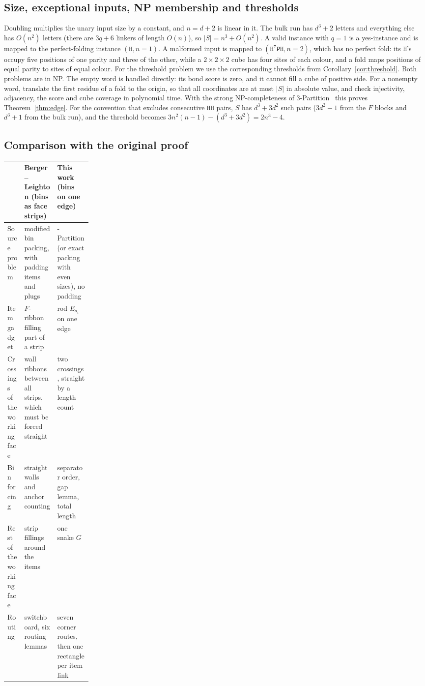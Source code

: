 \documentclass[11pt,letterpaper]{article}
\theoremstyle{definition}
\theoremstyle{remark}
\newcommand{\Hh}{\mathtt{H}}
\newcommand{\Pp}{\mathtt{P}}
\begin{document}
\subsection{Size, exceptional inputs, NP membership and thresholds}
Doubling multiplies the unary input size by a constant, and $n=d+2$ is linear in it. The bulk run
has $d^3+2$ letters and everything else has $O(n^2)$ letters (there are $3q+6$ linkers of length
$O(n)$), so $|S|=n^3+O(n^2)$. A valid instance with $q=1$ is a yes-instance and is mapped to the
perfect-folding instance $(\Hh,n=1)$. A malformed input is mapped to $(\Hh^7\Pp\Hh,n=2)$, which has no
perfect fold: its $\Hh$'s occupy five positions of one parity and three of the other, while a
$2\times2\times2$ cube has four sites of each colour, and a fold maps positions of equal parity to
sites of equal colour. For the threshold problem we use the corresponding thresholds from
Corollary~\ref{cor:threshold}. Both problems are in NP. The empty word is handled directly: its
bond score is zero, and it cannot fill a cube of positive side. For a nonempty word, translate the
first residue of a fold to the origin, so that all coordinates are at most $|S|$ in absolute value, and check injectivity,
adjacency, the score and cube coverage in polynomial time. With the strong NP-completeness of
3-Partition~\cite{GJ79} this proves Theorem~\ref{thm:edge}. For the convention that excludes
consecutive $\Hh\Hh$ pairs, $S$ has $d^3+3d^2$ such pairs ($3d^2-1$ from the $F$ blocks and $d^3+1$
from the bulk run), and the threshold becomes $3n^2(n-1)-(d^3+3d^2)=2n^3-4$.

\subsection{Comparison with the original proof}

\begin{center}
\small
\begin{tabularx}{\linewidth}{@{}>{\raggedright\arraybackslash}p{0.2\linewidth}>{\raggedright\arraybackslash}X>{\raggedright\arraybackslash}X@{}}
\toprule
& Berger--Leighton (bins as face strips) & This work (bins on one edge)\\
\midrule
Source problem & modified bin packing, with padding items and plugs & 3-Partition (or exact packing
  with even sizes), no padding\\
Item gadget & $F$-ribbon filling part of a strip & rod $E_{a_i}$ on one edge\\
Crossings of the working face & wall ribbons between all strips, which must be forced straight & two
  crossings, straight by a length count\\
Bin forcing & straight walls and anchor counting & separator order, gap lemma, total length\\
Rest of the working face & strip fillings around the items & one snake $G$\\
Routing & switchboard, six routing lemmas & seven corner routes, then one rectangle per item link\\
\bottomrule
\end{tabularx}
\end{center}
\end{document}
